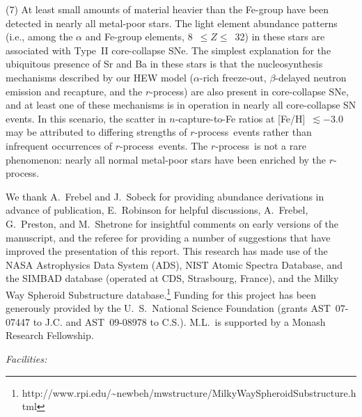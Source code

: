\documentclass{emulateapj}
\def\rpro{\mbox{$r$-process}}
\def\ncap{\mbox{$n$-capture}}
\begin{document}
(7)
At least small amounts of material heavier than the Fe-group have been 
detected in nearly all metal-poor stars.
The light element abundance patterns 
(i.e., among the $\alpha$ and Fe-group elements, 8~$\leq Z \leq$~32)
in these stars are associated with Type~II core-collapse SNe.
The simplest explanation for
the ubiquitous presence of Sr and Ba in these stars is that
the nucleosynthesis mechanisms described by our HEW model
($\alpha$-rich freeze-out, $\beta$-delayed neutron emission
and recapture, and the \rpro)
are also present in core-collapse SNe,
and at least one of these mechanisms is in operation 
in nearly all core-collapse SN events.
In this scenario, the scatter in \ncap-to-Fe ratios at [Fe/H]~$\lesssim -$3.0
may be attributed to differing strengths of \rpro\ events
rather than infrequent occurrences of \rpro\ events.
The \rpro\ is not a rare phenomenon: 
nearly all normal metal-poor stars have been enriched by the \rpro.


\acknowledgments

We thank 
A.\ Frebel and J.\ Sobeck
for providing abundance derivations in advance of publication, 
E.\ Robinson for helpful discussions, 
A.\ Frebel, G.\ Preston, and M.\ Shetrone 
for insightful comments on early versions of the manuscript,
and the referee for providing a number of suggestions that
have improved the presentation of this report.
This research has made use of the 
NASA Astrophysics Data System (ADS),
NIST Atomic Spectra Database, and the
SIMBAD database (operated at CDS, Strasbourg, France),
and the Milky Way Spheroid Substructure database.\footnote{
http://www.rpi.edu/\~{}newbeh/mwstructure/MilkyWaySpheroidSubstructure.html}
Funding for this project has been generously provided by 
the U.~S.\ National Science Foundation
(grants AST~07-07447 to J.C. and AST~09-08978 to C.S.).
M.L.\ is supported by a Monash Research Fellowship.


{\it Facilities:} 
\end{document}
